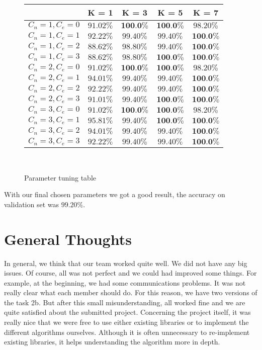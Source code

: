 \documentclass[12pt]{article}
\begin{document}
\begin{figure}[ht]
\centering
\begin{tabular}{|c|c|c|c|c|}
& K = 1 & K = 3 & K = 5 & K = 7\\
\hline
$C_n = 1, C_e = 0$ & $91.02\%$ & $\textbf{100.0\%}$ & $\textbf{100.0\%}$ & $98.20\%$\\
$C_n = 1, C_e = 1$ & $92.22\%$ & $99.40\%$ & $99.40\%$ & $\textbf{100.0\%}$\\
$C_n = 1, C_e = 2$ & $88.62\%$ & $98.80\%$ & $99.40\%$ & $\textbf{100.0\%}$\\
$C_n = 1, C_e = 3$ & $88.62\%$ & $98.80\%$ & $\textbf{100.0\%}$ & $\textbf{100.0\%}$\\
\hline
$C_n = 2, C_e = 0$ & $91.02\%$ & $\textbf{100.0\%}$ & $\textbf{100.0\%}$ & $98.20\%$\\
$C_n = 2, C_e = 1$ & $94.01\%$ & $99.40\%$ & $99.40\%$ & $\textbf{100.0\%}$\\
$C_n = 2, C_e = 2$ & $92.22\%$ & $99.40\%$ & $99.40\%$ & $\textbf{100.0\%}$\\
$C_n = 2, C_e = 3$ & $91.01\%$ & $99.40\%$ & $\textbf{100.0\%}$ & $\textbf{100.0\%}$\\
\hline
$C_n = 3, C_e = 0$ & $91.02\%$ & $\textbf{100.0\%}$ & $\textbf{100.0\%}$ & $98.20\%$\\
$C_n = 3, C_e = 1$ & $95.81\%$ & $99.40\%$ & $\textbf{100.0\%}$ & $\textbf{100.0\%}$\\
$C_n = 3, C_e = 2$ & $94.01\%$ & $99.40\%$ & $99.40\%$ & $\textbf{100.0\%}$\\
$C_n = 3, C_e = 3$ & $92.22\%$ & $99.40\%$ & $99.40\%$ & $\textbf{100.0\%}$\\
\end{tabular}\\
\caption{Parameter tuning table}
\label{fig:res_table}
\end{figure}

With our final chosen parameters we got a good result, the accuracy on validation set was $99.20\%$.

\section*{General Thoughts}
In general, we think that our team worked quite well. We did not have any big issues. Of course, all was not perfect and we could had improved some things. For example, at the beginning, we had some communications problems. It was not really clear what each member should do. For this reason, we have two versions of the task 2b. But after this small misunderstanding, all worked fine and we are quite satisfied about the submitted project.
\newline Concerning the project itself, it was really nice that we were free to use either existing libraries or to implement the different algorithms ourselves. Although it is often unnecessary to re-implement existing libraries, it helps understanding the algorithm more in depth.
\end{document}

